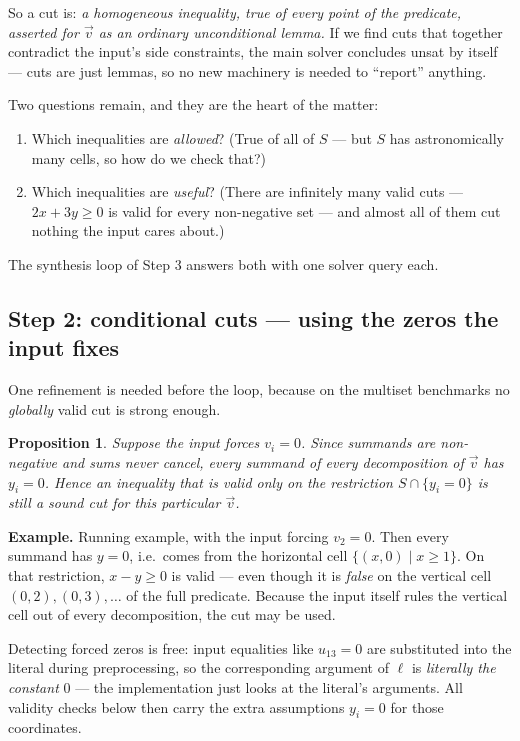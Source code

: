\documentclass[11pt]{article}
\newcommand{\Sset}{\ensuremath{S}}
\newcommand{\vv}{\ensuremath{\vec{v}}\xspace}
\newtheorem{proposition}{Proposition}
\begin{document}
So a cut is: \emph{a homogeneous inequality, true of every point of the
predicate, asserted for $\vv$ as an ordinary unconditional lemma.} If we
find cuts that together contradict the input's side constraints, the main
solver concludes \textsf{unsat} by itself --- cuts are just lemmas, so no
new machinery is needed to ``report'' anything.

Two questions remain, and they are the heart of the matter:
\begin{enumerate}
\item Which inequalities are \emph{allowed}? (True of all of $\Sset$ ---
  but $\Sset$ has astronomically many cells, so how do we check that?)
\item Which inequalities are \emph{useful}? (There are infinitely many
  valid cuts --- $2x + 3y \ge 0$ is valid for every non-negative set ---
  and almost all of them cut nothing the input cares about.)
\end{enumerate}
The synthesis loop of Step 3 answers both with one solver query each.

\subsection{Step 2: conditional cuts --- using the zeros the input fixes}

One refinement is needed before the loop, because on the multiset
benchmarks no \emph{globally} valid cut is strong enough.

\begin{proposition}
Suppose the input forces $v_i = 0$. Since summands are non-negative and
sums never cancel, \emph{every} summand of every decomposition of $\vv$
has $y_i = 0$. Hence an inequality that is valid only on the
\emph{restriction} $\Sset \cap \{y_i = 0\}$ is still a sound cut for this
particular $\vv$.
\end{proposition}

\begin{exbox}
\textbf{Example.} Running example, with the input forcing $v_2 = 0$.
Then every summand has $y = 0$, i.e.\ comes from the horizontal cell
$\{(x,0) \mid x \ge 1\}$. On that restriction, $x - y \ge 0$ is valid ---
even though it is \emph{false} on the vertical cell $(0,2), (0,3),
\ldots$ of the full predicate. Because the input itself rules the
vertical cell out of every decomposition, the cut may be used.
\end{exbox}

Detecting forced zeros is free: input equalities like $u_{13} = 0$ are
substituted into the literal during preprocessing, so the corresponding
argument of $\ell$ is \emph{literally the constant} $0$ --- the
implementation just looks at the literal's arguments. All validity checks
below then carry the extra assumptions $y_i = 0$ for those coordinates.
\end{document}
